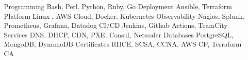 
\begin{cvskills}

    \cvskill
    {Programming} %
    {Bash, Perl, Python, Ruby, Go} %
    \cvskill
    {Deployment} %
    {Ansible, Terraform} %
    \cvskill
    {Platform} %
    {Linux , AWS Cloud, Docker, Kubernetes} %
    \cvskill
    {Observability} %
    {Nagios, Splunk, Prometheus, Grafana, Datadog} %
    \cvskill
    {CI/CD} %
    {Jenkins, Github Actions, TeamCity} %
    \cvskill
    {Services} %
    {DNS, DHCP, CDN, PXE, Consul, Netscaler} %
    \cvskill
    {Databases} %
    {PostgreSQL, MongoDB, DynamoDB} %
    \cvskill
    {Certificates} %
    {RHCE, SCSA, CCNA, AWS CP, Terraform CA } %

\end{cvskills}
